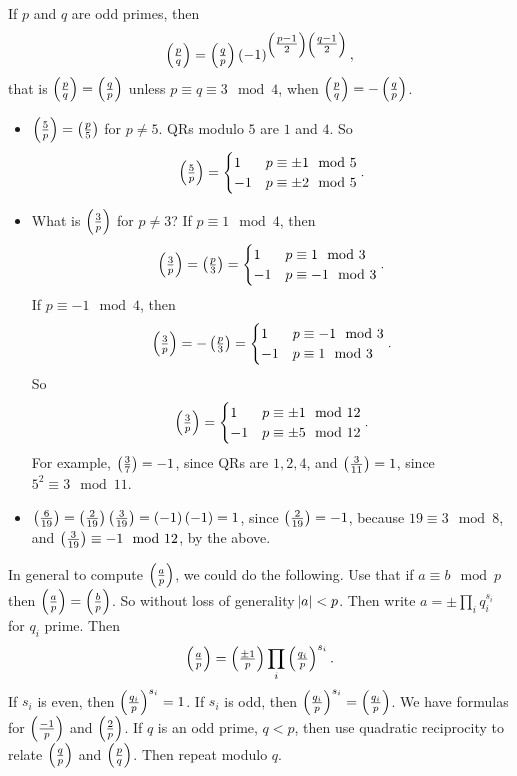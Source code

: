 \begin{theorem}
\label{thm:40}
If $ p $ and $ q $ are odd primes, then
$$ \symbol{p}{q} = \symbol{q}{p}\br{-1}^{\br{\tfrac{p - 1}{2}}\br{\tfrac{q - 1}{2}}}, $$
that is $ \symbol{p}{q} = \symbol{q}{p} $ unless $ p \equiv q \equiv 3 \mod 4 $, when $ \symbol{p}{q} = -\symbol{q}{p} $.
\end{theorem}

\begin{example*}
\hfill
\begin{itemize}
\item $ \symbol{5}{p} = \symbol{p}{5} $ for $ p \ne 5 $. QRs modulo $ 5 $ are $ 1 $ and $ 4 $. So
$$ \symbol{5}{p} =
\begin{cases}
1 & p \equiv \pm 1 \mod 5 \\
-1 & p \equiv \pm 2 \mod 5
\end{cases}.
$$

\item What is $ \symbol{3}{p} $ for $ p \ne 3 $? If $ p \equiv 1 \mod 4 $, then
$$ \symbol{3}{p} = \symbol{p}{3} =
\begin{cases}
1 & p \equiv 1 \mod 3 \\
-1 & p \equiv -1 \mod 3
\end{cases}.
$$
If $ p \equiv -1 \mod 4 $, then
$$ \symbol{3}{p} = -\symbol{p}{3} =
\begin{cases}
1 & p \equiv -1 \mod 3 \\
-1 & p \equiv 1 \mod 3
\end{cases}.
$$
So
$$ \symbol{3}{p} =
\begin{cases}
1 & p \equiv \pm 1 \mod 12 \\
-1 & p \equiv \pm 5 \mod 12
\end{cases}.
$$
For example, $ \symbol{3}{7} = -1 $, since QRs are $ 1, 2, 4 $, and $ \symbol{3}{11} = 1 $, since $ 5^2 \equiv 3 \mod 11 $.
\item $ \symbol{6}{19} = \symbol{2}{19}\symbol{3}{19} = \br{-1}\br{-1} = 1 $, since $ \symbol{2}{19} = -1 $, because $ 19 \equiv 3 \mod 8 $, and $ \symbol{3}{19} \equiv -1 \mod 12 $, by the above.
\end{itemize}
\end{example*}

In general to compute $ \symbol{a}{p} $, we could do the following. Use that if $ a \equiv b \mod p $ then $ \symbol{a}{p} = \symbol{b}{p} $. So without loss of generality $ \abs{a} < p $. Then write $ a = \pm\prod_i q_i^{s_i} $ for $ q_i $ prime. Then
$$ \symbol{a}{p} = \symbol{\pm 1}{p} \prod_i \symbol{q_i}{p}^{s_i}. $$
If $ s_i $ is even, then $ \symbol{q_i}{p}^{s_i} = 1 $. If $ s_i $ is odd, then $ \symbol{q_i}{p}^{s_i} = \symbol{q_i}{p} $. We have formulas for $ \symbol{-1}{p} $ and $ \symbol{2}{p} $. If $ q $ is an odd prime, $ q < p $, then use quadratic reciprocity to relate $ \symbol{q}{p} $ and $ \symbol{p}{q} $. Then repeat modulo $ q $.

